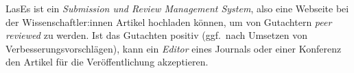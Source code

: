 
LasEs ist ein \emph{Submission und Review Management System}, also eine Webseite bei der Wissenschaftler:innen Artikel hochladen können, um von Gutachtern \emph{peer reviewed} zu werden.
Ist das Gutachten positiv (ggf.\ nach Umsetzen von Verbesserungsvorschlägen), kann ein \emph{Editor} eines Journals oder einer Konferenz den Artikel für die Veröffentlichung akzeptieren.
